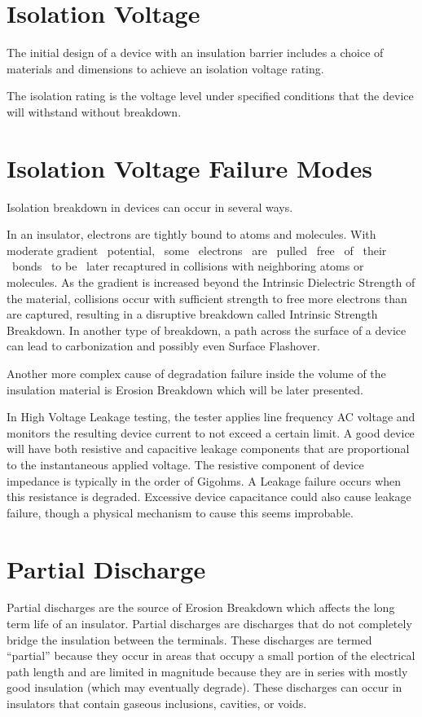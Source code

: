 \section*{Isolation Voltage}
The initial design of a device with an insulation barrier includes a choice of materials and dimensions to achieve an isolation voltage rating.

The isolation rating is the voltage level under specified conditions that the device will withstand without breakdown.

\section*{Isolation Voltage Failure Modes}
Isolation breakdown in devices can occur in several ways.

In an insulator, electrons are tightly bound to atoms and molecules. With moderate gradient ~potential, ~some ~electrons ~are ~pulled ~free ~of ~their ~bonds ~to be ~later recaptured in collisions with neighboring atoms or molecules. As the gradient is increased beyond the Intrinsic Dielectric Strength of the material, collisions occur with sufficient strength to free more electrons than are captured, resulting in a disruptive breakdown called Intrinsic Strength Breakdown. In another type of breakdown, a path across the surface of a device can lead to carbonization and possibly even Surface Flashover.

Another more complex cause of degradation failure inside the volume of the insulation material is Erosion Breakdown which will be later presented.

In High Voltage Leakage testing, the tester applies line frequency AC voltage and monitors the resulting device current to not exceed a certain limit. A good device will have both resistive and capacitive leakage components that are proportional to the instantaneous applied voltage. The resistive component of device impedance is typically in the order of Gigohms. A Leakage failure occurs when this resistance is degraded. Excessive device capacitance could also cause leakage failure, though a physical mechanism to cause this seems improbable.

\section*{Partial Discharge}
Partial discharges are the source of Erosion Breakdown which affects the long term life of an insulator. Partial discharges are discharges that do not completely bridge the insulation between the terminals. These discharges are termed “partial” because they occur in areas that occupy a small portion of the electrical path length and are limited in magnitude because they are in series with mostly good insulation (which may eventually degrade). These discharges can occur in insulators that contain gaseous inclusions, cavities, or voids.

